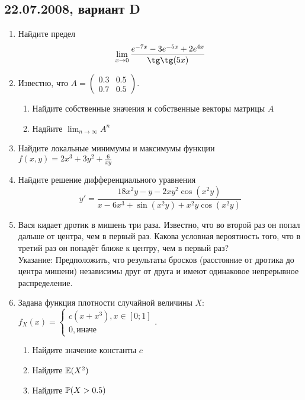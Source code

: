 \documentclass[pdftex,12pt,a4paper]{article}
\begin{document}
\subsection{22.07.2008, вариант D}
\begin{enumerate}
\item  Найдите предел 
\begin{equation}
\lim_{x\to 0} \frac{e^{-7x}-3e^{-5x}+2e^{4x}}{\tg\tg(5x)}
\end{equation}
\item Известно, что $A=
\left(\begin{array}{cc}
0.3 & 0.5\\
0.7 & 0.5
\end{array}\right)$.
\begin{enumerate}
\item Найдите собственные значения и собственные векторы матрицы $A$
\item Надйите $\lim_{n\to \infty} A^n$
\end{enumerate}
\item Найдите локальные минимумы и максимумы функции $f(x,y)=2x^3+3y^2+\frac{6}{xy}$\\
\item Найдите решение дифференциального уравнения 
\begin{equation}
y'=\frac{18x^2y-y-2xy^2\cos (x^2y)}{x-6x^3+\sin(x^2y)+x^2y\cos(x^2 y)}
\end{equation} 
\item Вася кидает дротик в мишень три раза. Известно, что во второй раз он попал дальше от центра, чем в первый раз. Какова условная вероятность того, что в третий раз он попадёт ближе к центру, чем в первый раз?\\
Указание: Предположить, что результаты бросков (расстояние от дротика до центра мишени) независимы друг от друга и имеют одинаковое непрерывное распределение.\\
\item Задана функция плотности случайной величины $X$:\\
$f_X(x)=\begin{cases}
c(x+x^3), x \in [0;1] \\
0, \text{иначе}
\end{cases}$.
\begin{enumerate}
\item Найдите значение константы $c$
\item Найдите  $\E(X^2)$
\item Найдите $\P(X>0.5)$
\end{enumerate}

\end{enumerate}
\end{document}
